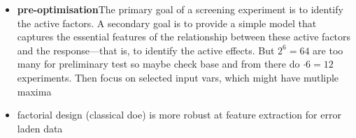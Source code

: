 \begin{itemize}
    \item \textbf{pre-optimisation}{The primary goal of a screening experiment is to identify the active factors. A secondary goal is to provide a simple model that captures the essential features of the relationship between these active factors and the response—that is, to identify the active effects. \cite{miller2001using}} But $2^6=64$ are too many for preliminary test so maybe check base and from there do $\cdot6=12$ experiments. Then focus on selected input vars, which might have mutliple maxima \\ 
    \item factorial design (classical \gls{doe}) is more robust at feature extraction for error laden data \cite{giunta2003overview}
\end{itemize}
%
